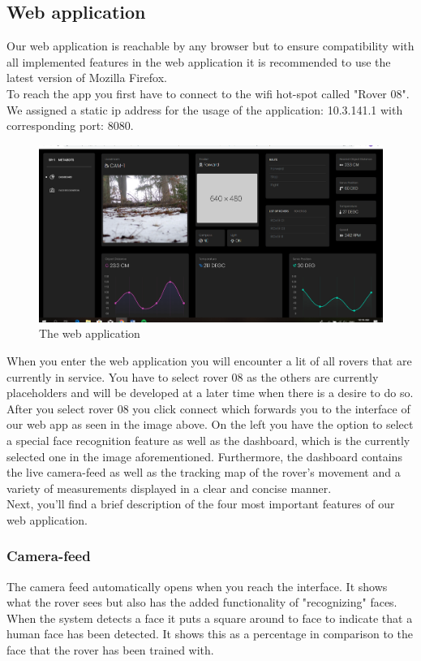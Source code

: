 \documentclass[12pt]{article}
\begin{document}
 	\subsection{Web application}
 	Our web application is reachable by any browser but to ensure compatibility with all implemented features in the web application it is recommended to use the latest version of Mozilla Firefox.\\
 	To reach the app you first have to connect to the wifi hot-spot called "Rover 08". We assigned a static ip address for the usage of the application: 10.3.141.1 with corresponding port: 8080.
 	\begin{figure}[H]
 		\includegraphics[width=\columnwidth]{Webpage.png}
 		\caption{The web application}
 	\end{figure} 
 	When you enter the web application you will encounter a lit of all rovers that are currently in service. You have to select rover 08 as the others are currently placeholders and will be developed at a later time when there is a desire to do so. After you select rover 08 you click connect which forwards you to the interface of our web app as seen in the image above. On the left you have the option to select a special face recognition feature as well as the dashboard, which is the currently selected one in the image aforementioned. Furthermore, the dashboard contains the live camera-feed as well as the tracking map of the rover's movement and a variety of measurements displayed in a clear and concise manner.\\
 	Next, you'll find a brief description of the four most important features of our web application.
 	\subsubsection{Camera-feed}
 	The camera feed automatically opens when you reach the interface. It shows what the rover sees but also has the added functionality of "recognizing" faces. When the system detects a face it puts a square around to face to indicate that a human face has been detected. It shows this as a percentage in comparison to the face that the rover has been trained with.
\end{document}
